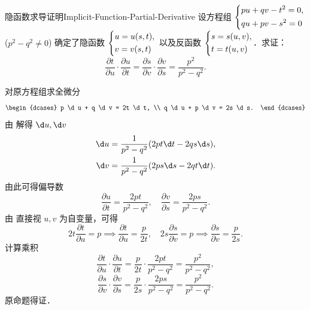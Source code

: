 \begin{problem}{隐函数求导证明}{Implicit-Function-Partial-Derivative}
    设方程组 $\begin{dcases} pu + qv - t^2 = 0, \\ qu + pv - s^2 = 0 \end{dcases}$ ($p^2 - q^2 \neq 0$) 确定了隐函数 $\begin{dcases} u = u(s, t), \\ v = v(s, t) \end{dcases}$ 以及反函数 $\begin{dcases} s = s(u, v), \\ t = t(u, v) \end{dcases}$．求证：
    \begin{equation}
        \frac{\partial t}{\partial u} \cdot \frac{\partial u}{\partial t} = \frac{\partial s}{\partial v} \cdot \frac{\partial v}{\partial s} = \frac{p^2}{p^2 - q^2}.
    \end{equation}
\end{problem}

\begin{myproof}
    对原方程组求全微分
    \begin{equation}
        \label{eq:diff-system}
        \begin{dcases}
            p \d u + q \d v = 2t \d t, \\
            q \d u + p \d v = 2s \d s.
        \end{dcases}
    \end{equation}
    由  解得 $\d u, \d v$
    \begin{equation}
        \begin{aligned}
            \d u & = \frac{1}{p^2 - q^2} (2pt \d t - 2qs \d s), \\
            \d v & = \frac{1}{p^2 - q^2} (2ps \d s - 2qt \d t).
        \end{aligned}
    \end{equation}
    由此可得偏导数
    \begin{equation}
        \frac{\partial u}{\partial t} = \frac{2pt}{p^2 - q^2}, \quad \frac{\partial v}{\partial s} = \frac{2ps}{p^2 - q^2}.
    \end{equation}
    由  直接视 $u, v$ 为自变量，可得
    \begin{equation}
        2t \frac{\partial t}{\partial u} = p \implies \frac{\partial t}{\partial u} = \frac{p}{2t}, \quad 2s \frac{\partial s}{\partial v} = p \implies \frac{\partial s}{\partial v} = \frac{p}{2s}.
    \end{equation}
    计算乘积
    \begin{equation}
        \frac{\partial t}{\partial u} \cdot \frac{\partial u}{\partial t} = \frac{p}{2t} \cdot \frac{2pt}{p^2 - q^2} = \frac{p^2}{p^2 - q^2},
    \end{equation}
    \begin{equation}
        \frac{\partial s}{\partial v} \cdot \frac{\partial v}{\partial s} = \frac{p}{2s} \cdot \frac{2ps}{p^2 - q^2} = \frac{p^2}{p^2 - q^2}.
    \end{equation}
    原命题得证．
\end{myproof}

\endinput
